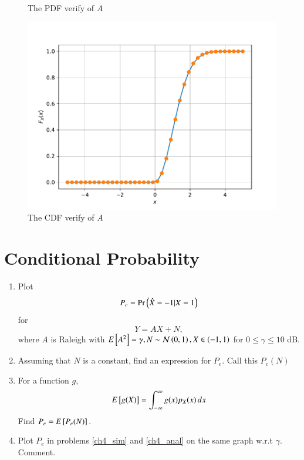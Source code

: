 \documentclass[journal,12pt,twocolumn]{IEEEtran}
\renewcommand\thesection{\arabic{section}}
\begin{document}
\begin{enumerate}[label=\thesection.\arabic*
,ref=\thesection.\theenumi]
\begin{figure}
\caption{The PDF verify of $A$}
\label{fig:6.3_pdf}
\end{figure}
\begin{figure}
\centering
\includegraphics[width=\columnwidth]{./figs/sqrt_cdf}
\caption{The CDF verify of $A$}
\label{fig:6.3_cdf}
\end{figure}
\end{enumerate}
\section{Conditional Probability}
\begin{enumerate}[label=\thesection.\arabic*
,ref=\thesection.\theenumi]
\item
\label{ch4_sim}
Plot 
\begin{equation}
P_e = \Pr\left(\hat{X} = -1|X=1\right)
\end{equation}
%
for 
\begin{equation}
Y = AX+N,
\end{equation}
where $A$ is Raleigh with $E{}\left[A^2\right] = \gamma, N \sim \mathcal{N}\left(0,1\right), X \in \left(-1,1\right)$ for $0 \le \gamma \le 10$ dB.
%
\item
Assuming that $N$ is a constant, find an expression for $P_e$.  Call this $P_e(N)$
%
\item
%
\label{ch4_anal}
For a function $g$,
\begin{equation}
E{}\left[g(X)\right] = \int_{-\infty}^{\infty}g(x)p_{X}(x)\, dx
\end{equation}
%
Find $P_e = E{}\left[P_e(N)\right]$.
%
\item
Plot $P_e$ in problems \ref{ch4_sim} and \ref{ch4_anal} on the same graph w.r.t $\gamma$.  Comment.
		\end{enumerate}
\end{document}
